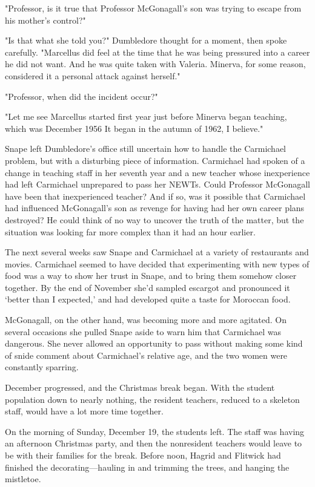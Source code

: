"Professor, is it true that Professor McGonagall's son was trying to escape from his mother's control?"

"Is that what she told you?" Dumbledore thought for a moment, then spoke carefully. "Marcellus did feel at the time that he was being pressured into a career he did not want. And he was quite taken with Valeria. Minerva, for some reason, considered it a personal attack against herself."

"Professor, when did the{\el} incident{\el} occur?"

"Let me see{\el} Marcellus started first year just before Minerva began teaching, which was December 1956{\el} It began in the autumn of 1962, I believe."

Snape left Dumbledore's office still uncertain how to handle the Carmichael problem, but with a disturbing piece of information. Carmichael had spoken of a change in teaching staff in her seventh year and a new teacher whose inexperience had left Carmichael unprepared to pass her NEWTs. Could Professor McGonagall have been that inexperienced teacher? And if so, was it possible that Carmichael had influenced McGonagall's son as revenge for having had her own career plans destroyed? He could think of no way to uncover the truth of the matter, but the situation was looking far more complex than it had an hour earlier.

The next several weeks saw Snape and Carmichael at a variety of restaurants and movies. Carmichael seemed to have decided that experimenting with new types of food was a way to show her trust in Snape, and to bring them somehow closer together. By the end of November she'd sampled escargot and pronounced it `better than I expected,' and had developed quite a taste for Moroccan food.

McGonagall, on the other hand, was becoming more and more agitated. On several occasions she pulled Snape aside to warn him that Carmichael was dangerous. She never allowed an opportunity to pass without making some kind of snide comment about Carmichael's relative age, and the two women were constantly sparring.

December progressed, and the Christmas break began. With the student population down to nearly nothing, the resident teachers, reduced to a skeleton staff, would have a lot more time together.

On the morning of Sunday, December 19, the students left. The staff was having an afternoon Christmas party, and then the nonresident teachers would leave to be with their families for the break. Before noon, Hagrid and Flitwick had finished the decorating—hauling in and trimming the trees, and hanging the mistletoe.

